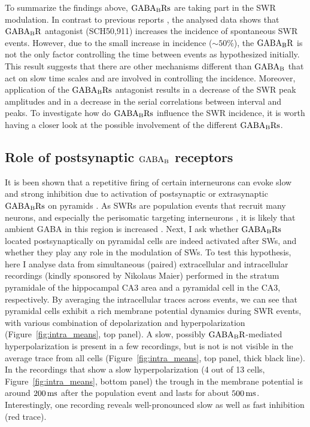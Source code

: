     To summarize the findings above, $\rm GABA_B Rs$ are taking part in the SWR
    modulation. In contrast to previous reports \citep[i.e.,][]{Hollnagel2014,
    Hofer2015}, the analysed data shows that $\rm GABA_BR$ antagonist
    (SCH50,911) increases the incidence of spontaneous SWR events. However, due
    to the small increase in incidence ($\sim 50\%$), the $\rm GABA_BR$ is not
    the only factor controlling the time between events as hypothesized
    initially. This result suggests that there are other mechanisms different
    than $\rm GABA_B$ that act on slow time scales and are involved in
    controlling the incidence. Moreover, application of the $\rm GABA_B Rs$
    antagonist results in a decrease of the SWR peak amplitudes and in a
    decrease in the serial correlations between interval and peaks. To
    investigate how do $\rm GABA_B Rs$ influence the SWR incidence, it is worth
    having a closer look at the possible involvement of the different $\rm
    GABA_BRs$.

  \subsection{Role of postsynaptic $\rm GABA_B$ receptors}
    It is been shown that a repetitive firing of certain interneurons can evoke
    slow and strong inhibition due to activation of postsynaptic or
    extrasynaptic $\rm GABA_BRs$ on pyramids \citep{Scanziani2000,
    Gassmann2012}. As SWRs are population events that recruit many neurons, and
    especially the perisomatic targeting interneurons \citep{Klausberger2009,
    Hajos2013}, it is likely that ambient GABA in this region is increased
    \citep{Hollnagel2014, Lang2014}. Next, I ask whether $\rm GABA_BRs$ located
    postsynaptically on pyramidal cells are indeed activated after SWs, and
    whether they play any role in the modulation of SWs. To test this
    hypothesis, here I analyse data from simultaneous (paired) extracellular
    and intracellular recordings (kindly sponsored by Nikolaus Maier) performed
    in the stratum pyramidale of the hippocampal CA3 area and a pyramidal cell
    in the CA3, respectively. By averaging the intracellular traces across
    events, we can see that pyramidal cells exhibit a rich membrane potential
    dynamics during SWR events, with various combination of depolarization and
    hyperpolarization (Figure~\ref{fig:intra_means}, top panel). A slow,
    possibly $\rm GABA_BR$-mediated hyperpolarization is present in a few
    recordings, but is not is not visible in the average trace from all cells
    (Figure~\ref{fig:intra_means}, top panel, thick black line). In the
    recordings that show a slow hyperpolarization (4 out of 13 cells,
    Figure~\ref{fig:intra_means}, bottom panel) the trough in the membrane
    potential is around $200 \, \rm ms$ after the population event and lasts
    for about $500 \, \rm ms$. Interestingly, one recording reveals
    well-pronounced slow as well as fast inhibition (red trace).

